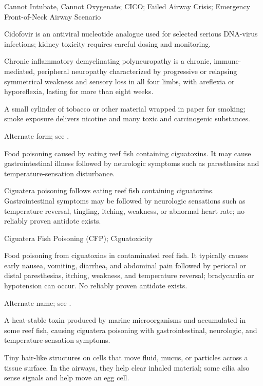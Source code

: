 \synonyms
Cannot Intubate, Cannot Oxygenate; CICO; Failed Airway Crisis; Emergency Front-of-Neck Airway Scenario

 Cidofovir is an antiviral nucleotide analogue used for selected serious DNA-virus infections; kidney toxicity requires careful dosing and monitoring.

 Chronic inflammatory demyelinating polyneuropathy is a chronic, immune-mediated,
peripheral neuropathy characterized by progressive or relapsing symmetrical weakness and
sensory loss in all four limbs, with areflexia or hyporeflexia, lasting for more than
eight weeks.

 A small cylinder of tobacco or other material wrapped in paper for smoking; smoke exposure delivers nicotine and many toxic and carcinogenic substances.

 Alternate form; see .

 Food poisoning caused by eating reef fish containing ciguatoxins. It may cause
gastrointestinal illness followed by neurologic symptoms such as paresthesias and
temperature-sensation disturbance.

 Ciguatera poisoning follows eating reef fish containing ciguatoxins. Gastrointestinal symptoms may be followed by neurologic sensations such as temperature reversal, tingling, itching, weakness, or abnormal heart rate; no reliably proven antidote exists.

\synonyms
Ciguatera Fish Poisoning (CFP); Ciguatoxicity

 Food poisoning from ciguatoxins in contaminated reef fish. It typically causes early nausea, vomiting, diarrhea, and abdominal pain followed by perioral or distal paresthesias, itching, weakness, and temperature reversal; bradycardia or hypotension can occur. No reliably proven antidote exists.

 Alternate name; see .

 A heat-stable toxin produced by marine microorganisms and accumulated in some reef fish, causing ciguatera poisoning with gastrointestinal, neurologic, and temperature-sensation symptoms.

 Tiny hair-like structures on cells that move fluid, mucus, or particles across a tissue surface. In the airways, they help clear inhaled material; some cilia also sense signals and help move an egg cell.

